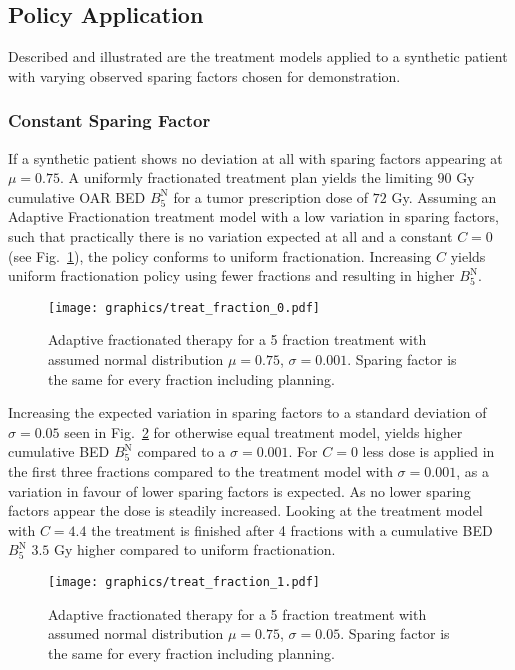 \documentclass[\relativeRoot/ada.tex]{subfiles}
\begin{document}
\subsection{Policy Application}

Described and illustrated are the treatment models applied to a synthetic patient with varying observed sparing factors chosen for demonstration. 

\subsubsection{Constant Sparing Factor}
If a synthetic patient shows no deviation at all with sparing factors appearing at $\mu = 0.75$. A uniformly fractionated treatment plan yields the limiting $90$ Gy cumulative OAR BED $B_5^{\text{N}}$ for a tumor prescription dose of $72$ Gy. Assuming an Adaptive Fractionation treatment model with a low variation in sparing factors, such that practically there is no variation expected at all and a constant $C=0$ (see Fig.~\ref{fig:treat_fraction_0}), the policy conforms to uniform fractionation. Increasing $C$ yields uniform fractionation policy using fewer fractions and resulting in higher $B_5^{\text{N}}$.
\begin{figure}[!htb]
    \centering
    \texttt{[image: graphics/treat\_fraction\_0.pdf]}
    \caption{Adaptive fractionated therapy for a 5 fraction treatment with assumed normal distribution $\mu=0.75$, $\sigma=0.001$. Sparing factor is the same for every fraction including planning.}
    \label{fig:treat_fraction_0}
\end{figure}

Increasing the expected variation in sparing factors to a standard deviation of $\sigma=0.05$ seen in Fig.~\ref{fig:treat_fraction_1} for otherwise equal treatment model, yields higher cumulative BED $B_5^{\text{N}}$ compared to a $\sigma=0.001$. For $C=0$ less dose is applied in the first three fractions compared to the treatment model with $\sigma=0.001$, as a variation in favour of lower sparing factors is expected. As no lower sparing factors appear the dose is steadily increased. Looking at the treatment model with $C=4.4$ the treatment is finished after 4 fractions with a cumulative BED $B_5^{\text{N}}$ $3.5$ Gy higher compared to uniform fractionation.

\begin{figure}[!htb]
    \centering
    \texttt{[image: graphics/treat\_fraction\_1.pdf]}
    \caption{Adaptive fractionated therapy for a 5 fraction treatment with assumed normal distribution $\mu=0.75$, $\sigma=0.05$. Sparing factor is the same for every fraction including planning.}
    \label{fig:treat_fraction_1}
\end{figure}
\end{document}
